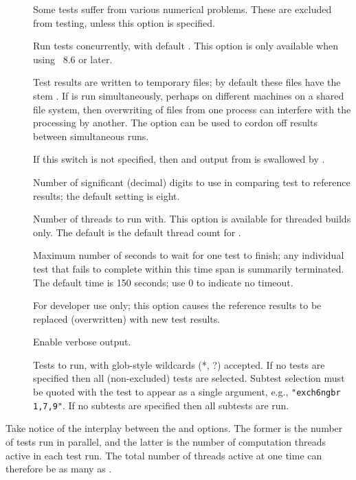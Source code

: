\begin{description}
\item[]
  Some tests suffer from various numerical problems.  These are
  excluded from testing, unless this option is specified.
\item[]
  Run  tests concurrently, with default . This option is
  only available when using \Tcl\ 8.6 or later.
\item[]
  Test results are written to temporary files; by default these files
  have the stem .  If 
  is run simultaneously, perhaps on different machines on a shared
  file system, then overwriting of files from one process can
  interfere with the processing by another.  The 
  option can be used to cordon off results between simultaneous runs.
\item[]
  If this switch is not specified, then  and 
  output from  is swallowed by .
\item[]
 Number of significant (decimal) digits to use in comparing test to
 reference results; the default setting is eight.
\item[]
 Number of threads to run  with.  This option is available
 for threaded builds only.  The default is the default thread count
 for .
\item[]
 Maximum number of seconds to wait for one test to finish; any
 individual test that fails to complete within this time span is summarily
 terminated.  The default time is 150 seconds; use 0 to indicate no timeout.
\item[]
 For developer use only; this option causes the reference results to
 be replaced (overwritten) with new test results.
\item[]
 Enable verbose output.
\item[]
 Tests to run, with glob-style wildcards (*, ?) accepted.  If no tests
 are specified then all (non-excluded) tests are selected.  Subtest
 selection must be quoted with the test to appear as a single
 argument, e.g., \verb+"exch6ngbr 1,7,9"+.  If no subtests are
 specified then all subtests are run.
\end{description}
Take notice  of the interplay between the  and
 options. The former is the number of tests run in
parallel, and the latter is the number of computation threads active in
each test run. The total number of threads active at one time can
therefore be as many as .

